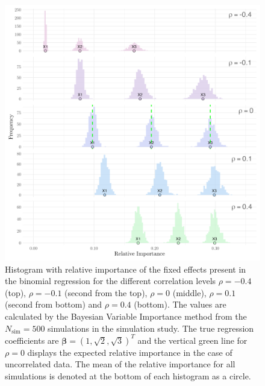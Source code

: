 \begin{figure}[H]
  \centering
  \includegraphics[width=1.1\linewidth]{Figures/Simulation study/Fixed_combined_logit.png}
  \caption{Histogram with relative importance of the fixed effects present in the binomial regression for the different correlation levels $\rho=-0.4$ (top), $\rho=-0.1$ (second from the top), $\rho=0$ (middle), $\rho=0.1$ (second from bottom) and $\rho=0.4$ (bottom). The values are calculated by the Bayesian Variable Importance method from the $N_{\text{sim}}=500$ simulations in the simulation study. The true regression coefficients are $\boldsymbol{\beta}=(1, \sqrt{2}, \sqrt{3})^T$ and the vertical green line for $\rho=0$ displays the expected relative importance in the case of uncorrelated data. The mean of the relative importance for all simulations is denoted at the bottom of each histogram as a circle.}
  \label{fig:fixed_combined_logit}
\end{figure}
